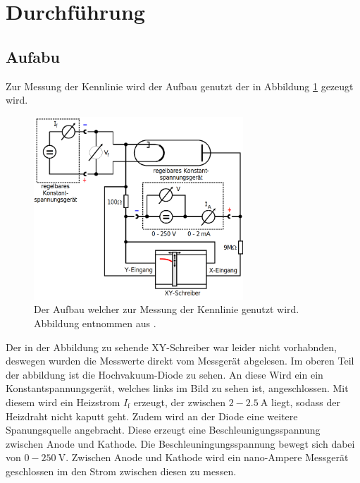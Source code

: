 \section{Durchführung}
\label{sec:Durchführung}
\subsection{Aufabu}
Zur Messung der Kennlinie wird der Aufbau genutzt der in Abbildung \ref{fig:aufbaukennlinie} gezeugt wird.
\begin{figure}
    \centering
    \includegraphics[width=0.7\textwidth]{content/data/aufbau_kennlinie.png}
    \caption{Der Aufbau welcher zur Messung der Kennlinie genutzt wird. Abbildung entnommen aus \cite[10]{anleitung}.}
    \label{fig:aufbaukennlinie}
\end{figure}
Der in der Abbildung zu sehende XY-Schreiber war leider nicht vorhabnden, deswegen wurden die Messwerte direkt vom Messgerät abgelesen.
Im oberen Teil der abbildung ist die Hochvakuum-Diode zu sehen.
An diese Wird ein ein Konstantspannungsgerät, welches links im Bild zu sehen ist, angeschlossen.
Mit diesem wird ein Heizstrom $I_\text{f}$ erzeugt, der zwischen $2-2.5 \SI{}{\A}$ liegt, sodass der Heizdraht nicht kaputt geht.
Zudem wird an der Diode eine weitere Spanungsquelle angebracht.
Diese erzeugt eine Beschleunigungsspannung zwischen Anode und Kathode.
Die Beschleuningungsspannung bewegt sich dabei von $0-250 \SI{}{\V}$.
Zwischen Anode und Kathode wird ein nano-Ampere Messgerät geschlossen im den Strom zwischen diesen zu messen.
